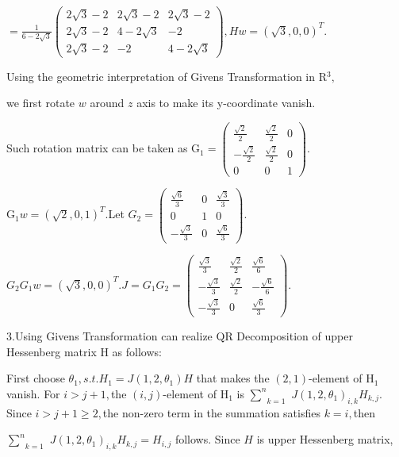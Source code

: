 \documentclass{article}
\begin{document}
$=\frac{1}{6-2\sqrt{3}}%
\begin{pmatrix}
2\sqrt{3}-2 & 2\sqrt{3}-2 & 2\sqrt{3}-2 \\ 
2\sqrt{3}-2 & 4-2\sqrt{3} & -2 \\ 
2\sqrt{3}-2 & -2 & 4-2\sqrt{3}%
\end{pmatrix}%
,Hw=\left( \sqrt{3},0,0\right) ^{T}.$

Using the geometric interpretation of Givens Transformation in R$^{3},$ 

we first rotate $w$ around $z$ axis to make its y-coordinate vanish.

Such rotation matrix can be taken as G$_{1}=%
\begin{pmatrix}
\frac{\sqrt{2}}{2} & \frac{\sqrt{2}}{2} & 0 \\ 
-\frac{\sqrt{2}}{2} & \frac{\sqrt{2}}{2} & 0 \\ 
0 & 0 & 1%
\end{pmatrix}%
.$

G$_{1}w=\left( \sqrt{2},0,1\right) ^{T}.$Let $G_{2}=%
\begin{pmatrix}
\frac{\sqrt{6}}{3} & 0 & \frac{\sqrt{3}}{3} \\ 
0 & 1 & 0 \\ 
-\frac{\sqrt{3}}{3} & 0 & \frac{\sqrt{6}}{3}%
\end{pmatrix}%
.$

$G_{2}G_{1}w=\left( \sqrt{3},0,0\right) ^{T}.J=G_{1}G_{2}=%
\begin{pmatrix}
\frac{\sqrt{3}}{3} & \frac{\sqrt{2}}{2} & \frac{\sqrt{6}}{6} \\ 
-\frac{\sqrt{3}}{3} & \frac{\sqrt{2}}{2} & -\frac{\sqrt{6}}{6} \\ 
-\frac{\sqrt{3}}{3} & 0 & \frac{\sqrt{6}}{3}%
\end{pmatrix}%
.$

3.Using Givens Transformation can realize QR Decomposition of upper
Hessenberg matrix H as follows:

First choose $\theta _{1},s.t.H_{1}=J\left( 1,2,\theta _{1}\right) H$ that
makes the $\left( 2,1\right) $-element of H$_{1}$ vanish. For $i>j+1,$the  $%
\left( i,j\right) $-element of H$_{1}$ is $\underset{k=1}{\overset{n}{\sum }}
$ $J\left( 1,2,\theta _{1}\right) _{i,k}H_{k,j}.$Since $i>j+1\geq 2,$the
non-zero term in the summation satisfies $k=i,$then 

$\underset{k=1}{\overset{n}{\sum }}$ $J\left( 1,2,\theta _{1}\right)
_{i,k}H_{k,j}=H_{i,j}$ follows. Since $H$ is upper Hessenberg matrix, 
\end{document}
